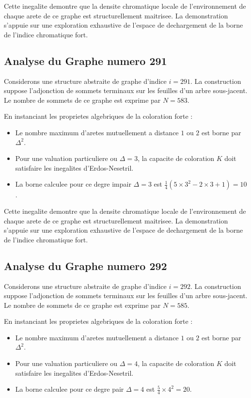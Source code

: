 \documentclass[11pt,a4paper]{article}
\begin{document}
Cette inegalite demontre que la densite chromatique locale de l'environnement de chaque arete de ce graphe est structurellement maitrisee. La demonstration s'appuie sur une exploration exhaustive de l'espace de dechargement de la borne de l'indice chromatique fort.

\subsection{Analyse du Graphe numero 291}
Considerons une structure abstraite de graphe d'indice $i = 291$. La construction suppose l'adjonction de sommets terminaux sur les feuilles d'un arbre sous-jacent. Le nombre de sommets de ce graphe est exprime par $N = 583$.

En instanciant les proprietes algebriques de la coloration forte :
\begin{itemize}
\item Le nombre maximum d'aretes mutuellement a distance $1$ ou $2$ est borne par $\Delta^2$.
\item Pour une valuation particuliere ou $\Delta = 3$, la capacite de coloration $K$ doit satisfaire les inegalites d'Erdos-Nesetril.
\item La borne calculee pour ce degre impair $\Delta = 3$ est $\frac{1}{4}(5 \times 3^2 - 2 \times 3 + 1) = 10$.
\end{itemize}

Cette inegalite demontre que la densite chromatique locale de l'environnement de chaque arete de ce graphe est structurellement maitrisee. La demonstration s'appuie sur une exploration exhaustive de l'espace de dechargement de la borne de l'indice chromatique fort.

\subsection{Analyse du Graphe numero 292}
Considerons une structure abstraite de graphe d'indice $i = 292$. La construction suppose l'adjonction de sommets terminaux sur les feuilles d'un arbre sous-jacent. Le nombre de sommets de ce graphe est exprime par $N = 585$.

En instanciant les proprietes algebriques de la coloration forte :
\begin{itemize}
\item Le nombre maximum d'aretes mutuellement a distance $1$ ou $2$ est borne par $\Delta^2$.
\item Pour une valuation particuliere ou $\Delta = 4$, la capacite de coloration $K$ doit satisfaire les inegalites d'Erdos-Nesetril.
\item La borne calculee pour ce degre pair $\Delta = 4$ est $\frac{5}{4} \times 4^2 = 20$.
\end{itemize}
\end{document}
